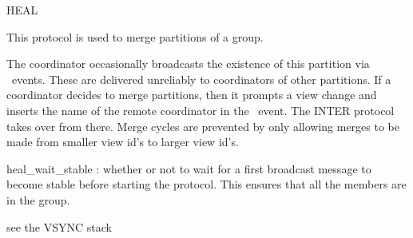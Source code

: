 \begin{Layer}{HEAL}

This protocol is used to merge partitions of a group.

\begin{Protocol}
The coordinator occasionally broadcasts the existence of this partition via
\DnGossipExt\ events.  These are delivered unreliably to coordinators of other
partitions.  If a coordinator decides to merge partitions, then it prompts a
view change and inserts the name of the remote coordinator in the \UpBlockOk\
event.  The INTER protocol takes over from there.  Merge cycles are prevented
by only allowing merges to be made from smaller view id's to larger view id's.
\end{Protocol}

\begin{Parameters}
\item
heal\_wait\_stable : whether or not to wait for a first broadcast message to
become stable before starting the protocol.  This ensures that all the members
are in the group.
\end{Parameters}

\begin{Properties}
\item \todo{}
\end{Properties}

\begin{Sources}
\end{Sources}

\begin{GenEvent}
\genevent{\UpPrompt}
\genevent{\DnGossipExt}
\end{GenEvent}

\begin{Testing}
\item see the VSYNC stack
\end{Testing}
\end{Layer}
